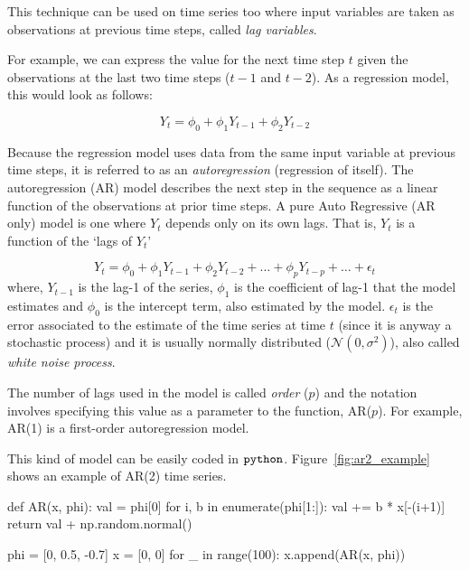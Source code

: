 This technique can be used on time series too where input variables are
taken as observations at previous time steps, called
\emph{lag variables}.

For example, we can express the value for the next time step \(t\) given
the observations at the last two time steps (\(t-1\) and \(t-2\)). As a
regression model, this would look as follows:

\begin{equation}
Y_{t} = \phi_0 + \phi_1Y_{t-1} + \phi_2Y_{t-2}
\end{equation}

Because the regression model uses data from the same input variable at
previous time steps, it is referred to as an \emph{autoregression}
(regression of itself). The autoregression (AR) model describes the next
step in the sequence as a linear function of the observations at prior
time steps. A pure Auto Regressive (AR only) model is one where \(Y_t\)
depends only on its own lags. That is, \(Y_t\) is a function of the
`lags of \(Y_t\)'

\begin{equation}
Y_t = \phi_0 + \phi_1 Y_{t-1} + \phi_2 Y_{t-2} + \ldots + \phi_p Y_{t-p} + \ldots + \epsilon_t
\label{eq:ar}
\end{equation}
where, \(Y_{t-1}\) is the lag-1 of the series, \(\phi_1\) is the
coefficient of lag-1 that the model estimates and \(\phi_0\) is the
intercept term, also estimated by the model. \(\epsilon_t\) is the error
associated to the estimate of the time series at time \(t\) (since it 
is anyway a stochastic process) and it is
usually normally distributed (\(\mathcal{N}(0, \sigma^2)\)), also called
\emph{white noise process}.

The number of lags used in the model is called \emph{order} (\(p\)) 
and the  notation involves specifying this value as 
a parameter to the function, AR(\(p\)). For example,
AR(1) is a first-order autoregression model.

This kind of model can be easily coded in \(\tt{python}\). Figure~\ref{fig:ar2_example} shows an example of AR(2) time series.

\begin{ipython}
def AR(x, phi):
    val = phi[0]
    for i, b in enumerate(phi[1:]):
        val += b * x[-(i+1)]
    return val + np.random.normal()

phi = [0, 0.5, -0.7]
x = [0, 0]
for _ in range(100):
    x.append(AR(x, phi))
\end{ipython}

